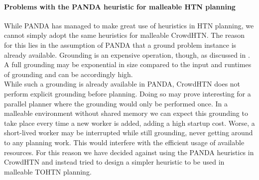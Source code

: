 \paragraph{Problems with the PANDA heuristic for malleable HTN planning}
While PANDA has managed to make great use of heuristics in HTN planning, we cannot simply adopt the same heuristics for malleable CrowdHTN. The reason for this lies in the assumption of PANDA that a ground problem instance is already available. Grounding is an expensive operation, though, as discussed in \cite{behnke2020succinct}. A full grounding may be exponential in size compared to the input and runtimes of grounding and can be accordingly high. \\
While such a grounding is already available in PANDA, CrowdHTN does not perform explicit grounding before planning. Doing so may prove interesting for a parallel planner where the grounding would only be performed once. In a malleable environment without shared memory we can expect this grounding to take place every time a new worker is added, adding a high startup cost. Worse, a short-lived worker may be interrupted while still grounding, never getting around to any planning work. This would interfere with the efficient usage of available resources. For this reason we have decided against using the PANDA heuristics in CrowdHTN and instead tried to design a simpler heuristic to be used in malleable TOHTN planning.

